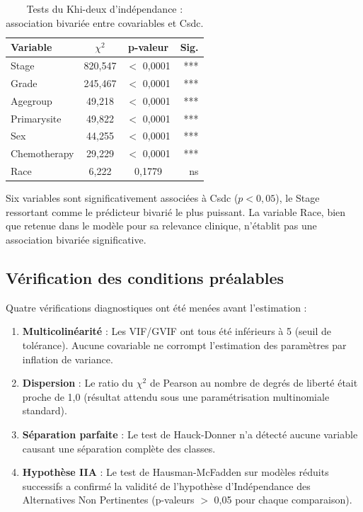 \documentclass[12pt,a4paper]{article}
\begin{document}
\begin{table}[H]
\centering
\caption{Tests du Khi-deux d'indépendance : association bivariée entre covariables et Csdc.}
\label{tab:chi2_tests}
\begin{tabular}{@{}lccr@{}}
\toprule
\textbf{Variable} & \textbf{$\chi^2$} & \textbf{p-valeur} & \textbf{Sig.} \\
\midrule
Stage & 820{,}547 & $<$ 0{,}0001 & *** \\
Grade & 245{,}467 & $<$ 0{,}0001 & *** \\
Agegroup & 49{,}218 & $<$ 0{,}0001 & *** \\
Primarysite & 49{,}822 & $<$ 0{,}0001 & *** \\
Sex & 44{,}255 & $<$ 0{,}0001 & *** \\
Chemotherapy & 29{,}229 & $<$ 0{,}0001 & *** \\
Race & 6{,}222 & 0{,}1779 & ns \\
\bottomrule
\end{tabular}
\end{table}

Six variables sont significativement associées à Csdc ($p < 0{,}05$), le Stage ressortant comme le prédicteur bivarié le plus puissant. La variable Race, bien que retenue dans le modèle pour sa relevance clinique, n'établit pas une association bivariée significative.

\subsection{Vérification des conditions préalables}

Quatre vérifications diagnostiques ont été menées avant l'estimation :

\begin{enumerate}
    \item \textbf{Multicolinéarité} : Les VIF/GVIF ont tous été inférieurs à 5 (seuil de tolérance). Aucune covariable ne corrompt l'estimation des paramètres par inflation de variance.
    
    \item \textbf{Dispersion} : Le ratio du $\chi^2$ de Pearson au nombre de degrés de liberté était proche de 1{,}0 (résultat attendu sous une paramétrisation multinomiale standard).
    
    \item \textbf{Séparation parfaite} : Le test de Hauck-Donner n'a détecté aucune variable causant une séparation complète des classes.
    
    \item \textbf{Hypothèse IIA} : Le test de Hausman-McFadden sur modèles réduits successifs a confirmé la validité de l'hypothèse d'Indépendance des Alternatives Non Pertinentes (p-valeurs $>$ 0{,}05 pour chaque comparaison).
\end{enumerate}
\end{document}
